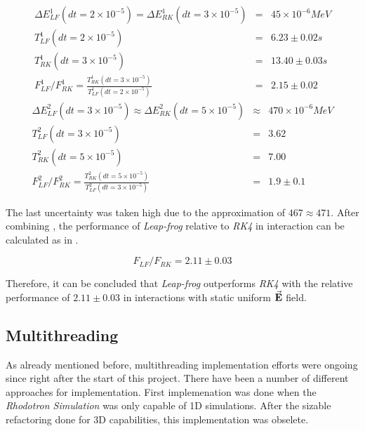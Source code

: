 \documentclass[a4paper,oneside,12pt]{report}
\numberwithin{equation}{chapter}
\begin{document}
\begin{eqnarray} \label{eq:f_lf_rk_3}
    \Delta E_{LF}^1 (dt=2 \times 10^{-5}) = \Delta E_{RK}^1 (dt=3 \times 10^{-5}) &=& 45 \times 10^{-6} MeV \nonumber\\
    T_{LF}^1(dt=2 \times 10^{-5})  &=& 6.23 \pm 0.02 s \nonumber\\ %
    T_{RK}^1(dt=3 \times 10^{-5})  &=& 13.40 \pm 0.03 s \nonumber\\ %
    F_{LF}^1/F_{RK}^1 = \frac{T_{RK}^1(dt=3 \times 10^{-5})}{T_{LF}^1(dt=2 \times 10^{-5})} &=& 2.15 \pm 0.02
\end{eqnarray}
\begin{eqnarray} \label{eq:f_lf_rk_4}
    \Delta E_{LF}^2 (dt=3 \times 10^{-5}) \approx \Delta E_{RK}^2 (dt=5 \times 10^{-5}) &\approx& 470 \times 10^{-6} MeV \nonumber\\
    T_{LF}^2(dt=3 \times 10^{-5})  &=& 3.62 \nonumber\\ %
    T_{RK}^2(dt=5 \times 10^{-5})  &=& 7.00 \nonumber\\ %
    F_{LF}^2/F_{RK}^2 = \frac{T_{RK}^2(dt=5 \times 10^{-5})}{T_{LF}^2(dt=3 \times 10^{-5})} &=& 1.9 \pm 0.1
\end{eqnarray}

The last uncertainty was taken high due to the approximation of $467 \approx 471$. After combining ,
the performance of \textit{Leap-frog} relative to \textit{RK4} in \eE interaction can be calculated as in .

\begin{equation}\label{eq:lf_rk_eE_relative_performance}
    F_{LF}/F_{RK} = 2.11 \pm 0.03
\end{equation}

Therefore, it can be concluded that \textit{Leap-frog} outperforms \textit{RK4} with the relative performance of $2.11 \pm 0.03$ in \eE interactions with static uniform $\vec{\textbf{E}}$ field. 

\subsection{Multithreading}
As already mentioned before, multithreading implementation efforts were ongoing since right after the start of this project. 
There have been a number of different approaches for implementation. 
First implemenation was done when the \textit{Rhodotron Simulation} was only capable of 1D simulations.
After the sizable refactoring done for 3D capabilities, this implementation was obselete. 
\end{document}
